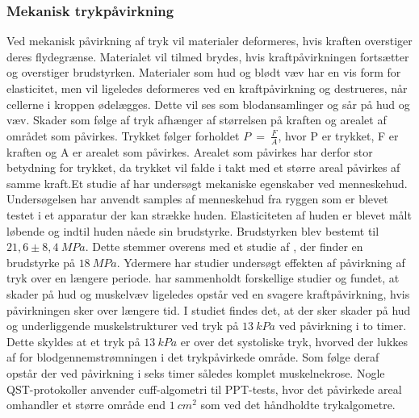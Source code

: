 \subsubsection{Mekanisk trykpåvirkning}
Ved mekanisk påvirkning af tryk vil materialer deformeres, hvis kraften overstiger deres flydegrænse. Materialet vil tilmed brydes, hvis kraftpåvirkningen fortsætter og overstiger brudstyrken. Materialer som hud og blødt væv har en vis form for elasticitet, men vil ligeledes deformeres ved en kraftpåvirkning og destrueres, når cellerne i kroppen ødelægges. Dette vil ses som blodansamlinger og sår på hud og væv. Skader som følge af tryk afhænger af størrelsen på kraften og arealet af området som påvirkes. Trykket følger forholdet $P~=~\frac{F}{A}$, hvor P er trykket, F er kraften og A er arealet som påvirkes. Arealet som påvirkes har derfor stor betydning for trykket, da trykket vil falde i takt med et større areal påvirkes af samme kraft.Et studie af  har undersøgt mekaniske egenskaber ved menneskehud. Undersøgelsen har anvendt samples af menneskehud fra ryggen som er blevet testet i et apparatur der kan strække huden. Elasticiteten af huden er blevet målt løbende og indtil huden nåede sin brudstyrke. Brudstyrken blev bestemt til $21,6 \pm 8,4~MPa$. Dette stemmer overens med et studie af , der finder en brudstyrke på $18~MPa$. Ydermere har studier undersøgt effekten af påvirkning af tryk over en længere periode.  har sammenholdt forskellige studier og fundet, at skader på hud og muskelvæv ligeledes opstår ved en svagere kraftpåvirkning, hvis påvirkningen sker over længere tid. I studiet findes det, at der sker skader på hud og underliggende muskelstrukturer ved tryk på $13~kPa$ ved påvirkning i to timer. Dette skyldes at et tryk på $13~kPa$ er over det systoliske tryk, hvorved der lukkes af for blodgennemstrømningen i det trykpåvirkede område. Som følge deraf opstår der ved påvirkning i seks timer således komplet muskelnekrose. \citep{sanders1995} Nogle QST-protokoller anvender cuff-algometri til PPT-tests, hvor det påvirkede areal omhandler et større område end $1~cm^{2}$ som ved det håndholdte trykalgometre. 


